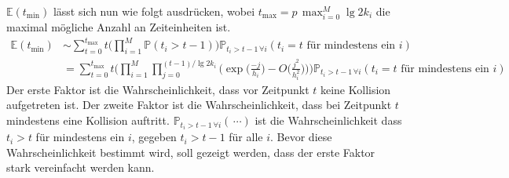 \documentclass[a4paper, 11pt, ngerman]{article}
\newcommand{\E}{\mathbb{E}}
\renewcommand{\P}{\mathbb{P}}
\begin{document}
$\E(t_{\min})$ lässt sich nun wie folgt ausdrücken, wobei $t_{\max} = p \, \max_{i = 0}^M \lg 2k_i$ die maximal mögliche Anzahl an Zeiteinheiten ist.
\begin{align*}
    \E(t_{\min})
     & \sim \sum_{t = 0}^{t_{\max}} t
    \Bigg ( \prod_{i = 1}^M \P(t_i > t - 1) \Bigg )
    \P_{t_i > t - 1 \, \forall i}(t_i = t \text{ für mindestens ein } i) \\
     & = \sum_{t = 0}^{t_{\max}} t
    \Bigg ( \prod_{i = 1}^M \prod_{j = 0}^{(t-1) / \lg 2k_i}
    \Bigg ( \exp \bigg ( \frac {-j}{h_i} \bigg )
        - O \bigg ( \frac {j^2} {h_i^2} \bigg ) \Bigg )\Bigg )
    \P_{t_i > t - 1 \, \forall i}(t_i = t \text{ für mindestens ein } i)
\end{align*}
Der erste Faktor ist die Wahrscheinlichkeit, dass vor Zeitpunkt $t$ keine Kollision aufgetreten ist. Der zweite Faktor ist die Wahrscheinlichkeit, dass bei Zeitpunkt $t$ mindestens eine Kollision auftritt. $\P_{t_i > t - 1 \, \forall i} (\,\cdots)$ ist die Wahrscheinlichkeit dass $t_i > t$ für mindestens ein $i$, gegeben $t_i > t - 1$ für alle $i$. Bevor diese Wahrscheinlichkeit bestimmt wird, soll gezeigt werden, dass der erste Faktor stark vereinfacht werden kann.
\end{document}

